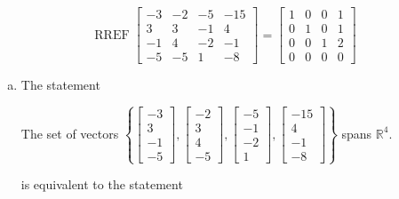 \begin{exerciseAnswer} 


\[\operatorname{RREF} \left[\begin{array}{cccc}
-3 & -2 & -5 & -15 \\
3 & 3 & -1 & 4 \\
-1 & 4 & -2 & -1 \\
-5 & -5 & 1 & -8
\end{array}\right] = \left[\begin{array}{cccc}
1 & 0 & 0 & 1 \\
0 & 1 & 0 & 1 \\
0 & 0 & 1 & 2 \\
0 & 0 & 0 & 0
\end{array}\right] \]


\begin{enumerate}[(a)]
\item The statement 
\begin{center}\begin{minipage}{0.8\textwidth}
 The set of vectors \( \left\{ \left[\begin{array}{c}
-3 \\
3 \\
-1 \\
-5
\end{array}\right] , \left[\begin{array}{c}
-2 \\
3 \\
4 \\
-5
\end{array}\right] , \left[\begin{array}{c}
-5 \\
-1 \\
-2 \\
1
\end{array}\right] , \left[\begin{array}{c}
-15 \\
4 \\
-1 \\
-8
\end{array}\right] \right\} \) spans \(\mathbb{R}^4\). 
\end{minipage}\end{center}
     is equivalent to the statement 
\begin{center}\begin{minipage}{0.8\textwidth}
 The vector equation \( x_{1} \left[\begin{array}{c}
-3 \\
3 \\

\end{array}
\end{minipage}
\end{center}
\end{enumerate}
\end{exerciseAnswer}
